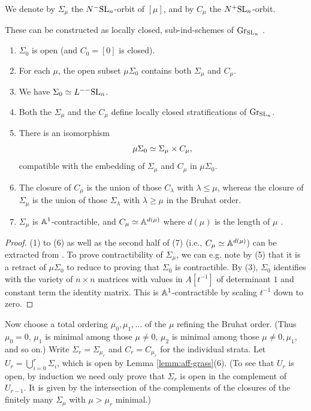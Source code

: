 \documentclass{amsart}
\renewcommand{\NB}[1]{}
\numberwithin{proposition}{section}
\numberwithin{equation}{section}
\newcommand{\Gr}[1]{{\mathrm{Gr}_{#1}}}
\begin{document}
\begin{definition}
We denote by $\Sigma_\mu$ the $N^-\mathrm{SL}_n$-orbit of $[\mu]$, and by $C_\mu$ the $N^+\mathrm{SL}_n$-orbit.
\end{definition}
These can be constructed as locally closed, sub-ind-schemes of $\Gr{\SL_n}$ \cite[\S2,\S3]{faltings-loop-groups}.
\begin{lemma} \label{lemm:aff-grass}
\begin{enumerate}
\item $\Sigma_0$ is open (and $C_0 = [0]$ is closed).
\item For each $\mu$, the open subset $\mu\Sigma_0$ contains both $\Sigma_\mu$ and $C_\mu$.
\item We have $\Sigma_0 \simeq L^{--}\mathrm{SL}_n$.
\item Both the $\Sigma_\mu$ and the $C_\mu$ define locally closed stratifications of $\Gr{\SL_n}$.
\item There is an isomorphism \[ \mu\Sigma_0 \simeq \Sigma_\mu \times C_\mu, \] compatible with the embedding of $\Sigma_\mu$ and $C_\mu$ in $\mu\Sigma_0$.
\item The closure of $C_\mu$ is the union of those $C_\lambda$ with $\lambda \le \mu$, whereas the closure of $\Sigma_\mu$ is the union of those $\Sigma_\lambda$ with $\lambda \ge \mu$ in the Bruhat order.\NB{or its opposite?}
\item $\Sigma_\mu$ is $\mathbb A^1$-contractible, and $C_\mu \simeq \mathbb A^{d(\mu)}$ where $d(\mu)$ is the length of $\mu$ \cite[p. 46]{faltings-loop-groups}.
\end{enumerate}
\end{lemma}
\begin{proof}
(1) to (6) as well as the second half of (7) (i.e., $C_\mu \simeq \mathbb A^{d(\mu)}$) can be extracted from \cite[\S3]{faltings-loop-groups}.\NB{unfortunately this is not immediate, since Faltings writes about the flag variety, not the Grassmannian}
To prove contractibility of $\Sigma_\mu$, we can e.g. note by (5) that it is a retract of $\mu\Sigma_0$ to reduce to proving that $\Sigma_0$ is contractible.
By (3), $\Sigma_0$ identifies with the variety of $n \times n$ matrices with values in $A[t^{-1}]$ of determinant $1$ and constant term the identity matrix.
This is $\mathbb A^1$-contractible by scaling $t^{-1}$ down to zero.
\end{proof}

Now choose a total ordering $\mu_0, \mu_1, \dots$ of the $\mu$ refining the Bruhat order.
(Thus $\mu_0 = 0$, $\mu_1$ is minimal among those $\mu \ne 0$, $\mu_2$ is minimal among those $\mu \ne 0,\mu_1$, and so on.)
Write $\Sigma_r=\Sigma_{\mu_r}$ and $C_r=C_{\mu_r}$ for the individual strata.
Let $U_r=\bigcup_{i=0}^r\Sigma_i$, which is open by Lemma \ref{lemm:aff-grass}(6).
(To see that $U_r$ is open, by induction we need only prove that $\Sigma_r$ is open in the complement of $U_{r-1}$.
It is given by the intersection of the complements of the closures of the finitely many $\Sigma_\mu$ with $\mu > \mu_r$ minimal.)
\end{document}
